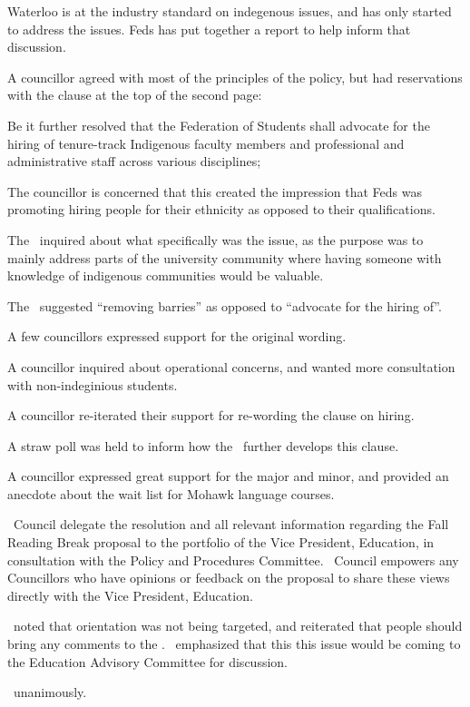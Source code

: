 \begin{information}
    Waterloo is at the industry standard on indegenous issues, and has only 
    started to address the issues. Feds has put together a report to help
    inform that discussion. 

    A councillor agreed with most of the principles of the policy, but had 
    reservations with the clause at the top of the second page:

    \begin{information}
        Be it further resolved that the Federation of Students shall advocate for the
        hiring of tenure-track Indigenous faculty members and professional and
        administrative staff across various disciplines;
    \end{information}

    The councillor is concerned that this created the impression that Feds was
    promoting hiring people for their ethnicity as opposed to their
    qualifications. 

    The \vped\ inquired about what specifically was the issue, as the purpose
    was to mainly address parts of the university community where having
    someone with knowledge of indigenous communities would be valuable.

    The \pres\ suggested ``removing barries'' as opposed to ``advocate for 
    the hiring of''.

    A few councillors expressed support for the original wording.

    A councillor inquired about operational concerns, and wanted more
    consultation with non-indeginious students.

    A councillor re-iterated their support for re-wording the clause on hiring. 

    A straw poll was held to inform how the \vpe\ further develops this clause.  

    A councillor expressed great support for the major and minor, and provided 
    an anecdote about the wait list for Mohawk language courses.
\end{information}

\begin{motion}
    \birt\ Council delegate the resolution and all relevant information
    regarding the Fall Reading Break proposal to the portfolio of the Vice
    President, Education, in consultation with the Policy and Procedures
    Committee.
    \bifrt\ Council empowers any Councillors who have opinions or feedback on
    the proposal to share these views directly with the Vice President,
    Education.
    \movers{\seneca}{\andrewc}

    \andrewc\ noted that orientation was not being targeted, and reiterated
    that people should bring any comments to the \vped. \andrewc\ emphasized
    that this this issue would be coming to the Education Advisory Committee
    for discussion.

    \carries\ unanimously.
\end{motion}

